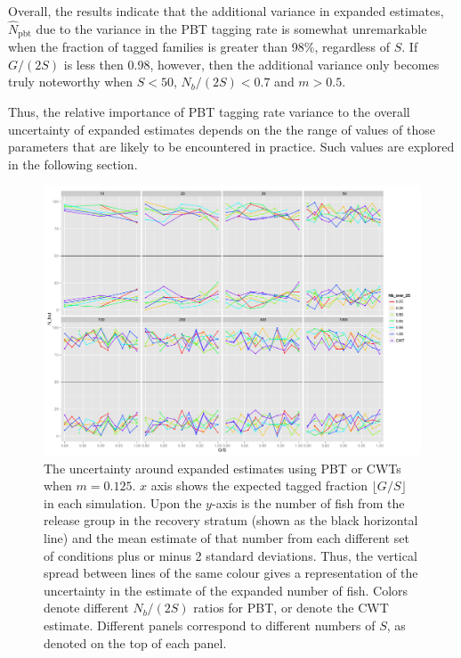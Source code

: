 \documentclass[11pt]{article}
\begin{document}
Overall, the results indicate that the additional variance in expanded estimates,
$\hat{N}_\mathrm{pbt}$ due to the variance in the PBT tagging rate is somewhat unremarkable 
when the fraction of tagged families is greater than 98\%, regardless of $S$.  If 
$G/(2S)$ is less then 0.98, however, then the additional variance only becomes truly 
noteworthy when $S<50$, $N_b/(2S) < 0.7$ and $m > 0.5$.

Thus, the relative importance of PBT tagging rate variance to the overall uncertainty of 
expanded estimates depends on the the range of values of those parameters that are
likely to be encountered in practice.  Such values are explored in the following section.

\begin{figure}
\includegraphics[width = .93\textwidth]{./images/sd_line_horns_m_0_125.pdf}
\caption{The uncertainty around expanded estimates using PBT or CWTs when $m = 0.125$.  $x$ axis shows the
expected tagged fraction $\lfloor G/S \rfloor$ in each simulation. Upon the $y$-axis is the number of fish from the
release group in the recovery stratum (shown as the black horizontal line) and the mean estimate of that number from each different set of 
conditions plus or minus 2 standard deviations.  Thus, the vertical spread between lines of the same colour gives a representation
of the uncertainty in the estimate of the expanded number of fish. Colors denote different $N_b/(2S)$ ratios for PBT, or denote
the CWT estimate.  Different
panels correspond to different numbers of $S$, as denoted on the top of each panel.
\label{fig:horn0.125}}
\end{figure}
\end{document}
